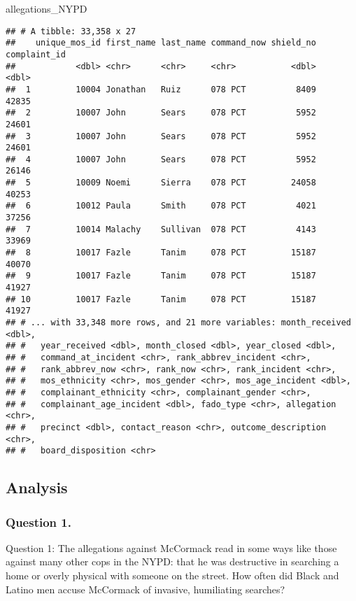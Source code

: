 \documentclass[
]{article}
\newenvironment{Shaded}{\begin{snugshade}}{\end{snugshade}}
\newcommand{\NormalTok}[1]{#1}
\begin{document}
\begin{Shaded}
\begin{Highlighting}[]
\NormalTok{allegations_NYPD}
\end{Highlighting}
\end{Shaded}

\begin{verbatim}
## # A tibble: 33,358 x 27
##    unique_mos_id first_name last_name command_now shield_no complaint_id
##            <dbl> <chr>      <chr>     <chr>           <dbl>        <dbl>
##  1         10004 Jonathan   Ruiz      078 PCT          8409        42835
##  2         10007 John       Sears     078 PCT          5952        24601
##  3         10007 John       Sears     078 PCT          5952        24601
##  4         10007 John       Sears     078 PCT          5952        26146
##  5         10009 Noemi      Sierra    078 PCT         24058        40253
##  6         10012 Paula      Smith     078 PCT          4021        37256
##  7         10014 Malachy    Sullivan  078 PCT          4143        33969
##  8         10017 Fazle      Tanim     078 PCT         15187        40070
##  9         10017 Fazle      Tanim     078 PCT         15187        41927
## 10         10017 Fazle      Tanim     078 PCT         15187        41927
## # ... with 33,348 more rows, and 21 more variables: month_received <dbl>,
## #   year_received <dbl>, month_closed <dbl>, year_closed <dbl>,
## #   command_at_incident <chr>, rank_abbrev_incident <chr>,
## #   rank_abbrev_now <chr>, rank_now <chr>, rank_incident <chr>,
## #   mos_ethnicity <chr>, mos_gender <chr>, mos_age_incident <dbl>,
## #   complainant_ethnicity <chr>, complainant_gender <chr>,
## #   complainant_age_incident <dbl>, fado_type <chr>, allegation <chr>,
## #   precinct <dbl>, contact_reason <chr>, outcome_description <chr>,
## #   board_disposition <chr>
\end{verbatim}

\hypertarget{analysis}{%
\subsection{Analysis}\label{analysis}}

\hypertarget{question-1.}{%
\subsubsection{Question 1.}\label{question-1.}}

Question 1: The allegations against McCormack read in some ways like
those against many other cops in the NYPD: that he was destructive in
searching a home or overly physical with someone on the street. How
often did Black and Latino men accuse McCormack of invasive, humiliating
searches?
\end{document}
